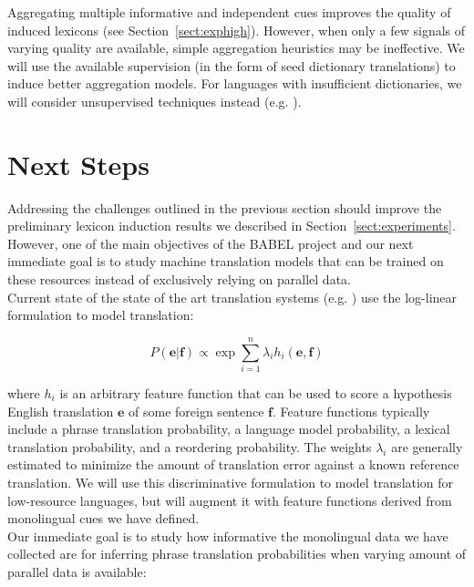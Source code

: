 \documentclass{article}
\newcommand{\secref}[1]{Section~\ref{#1}}
\begin{document}
Aggregating multiple informative and independent cues improves the quality of induced lexicons (see \secref{sect:exphigh}).  However, when only a few signals of varying quality are available, simple aggregation heuristics may be ineffective.  We will use the available supervision (in the form of seed dictionary translations) to induce better aggregation models.  For languages with insufficient dictionaries, we will consider unsupervised techniques instead (e.g. \cite{Klementiev:2006b, Klementiev:2008a}).

\section{Next Steps}

Addressing the challenges outlined in the previous section should improve the preliminary lexicon induction results we described in \secref{sect:experiments}.  However, one of the main objectives of the BABEL project and our next immediate goal is to study machine translation models that can be trained on these resources instead of exclusively relying on parallel data. \\

Current state of the state of the art translation systems (e.g. \cite{Chiang:2005}) use the log-linear formulation  \cite{Och:2002} to model translation:

\begin{equation}
P(\mathbf{e} | \mathbf{f}) \propto \exp \sum_{i=1}^{n}{\lambda_i h_i (\mathbf{e}, \mathbf{f})} \label{log-linear-formulation}
\end{equation}

where  $h_i$ is an arbitrary feature function that can be used to score a hypothesis English translation $\mathbf{e}$ of some foreign sentence $\mathbf{f}$.  Feature functions typically include a phrase translation probability, a language model probability, a lexical translation probability, and a reordering probability.  The weights $\lambda_i$ are generally estimated to minimize the amount of translation error against a known reference translation.  We will use this discriminative formulation to model translation for low-resource languages, but will augment it with feature functions derived from monolingual cues we have defined.  \\

Our immediate goal is to study how informative the monolingual data we have collected are for inferring phrase translation probabilities when varying amount of parallel data is available:
\end{document}
